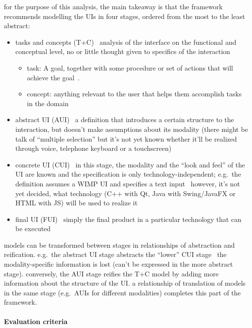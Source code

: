 for the purpose of this analysis, the main takeaway is that the framework recommends modelling the UIs in four stages, ordered from the most to the least abstract:
\begin{itemize}
    \item tasks and concepts (T+C) \textemdash\ analysis of the interface on the functional and conceptual level, no or little thought given to specifics of the interaction
    \begin{itemize}
        \item task: A goal, together with some procedure or set of actions that will achieve the goal~\cite{calvary_cameleon_glossary_2002}.
        \item concept: anything relevant to the user that helps them accomplish tasks in the domain
    \end{itemize}
    \item abstract UI (AUI) \textemdash\ a definition that introduces a certain structure to the interaction, but doesn't make assumptions about its modality (there might be talk of \enquote{multiple selection} but it's not yet known whether it'll be realized through voice, telephone keyboard or a touchscreen)
    \item concrete UI (CUI) \textemdash\ in this stage, the modality and the \enquote{look and feel} of the UI are known and the specification is only technology-independent;
    e.g.\ the definition assumes a WIMP UI and specifies a text input \textemdash\ however, it's not yet decided, what technology (C++ with Qt, Java with Swing/JavaFX or HTML with JS) will be used to realize it
    \item final UI (FUI) \textemdash\ simply the final product in a particular technology that can be executed
\end{itemize}

models can be transformed between stages in relationships of abstraction and reification.
e.g.\ the abstract UI stage abstracts the \enquote{lower} CUI stage \textemdash\ the modality-specific information is lost (can't be expressed in the more abstract stage).
conversely, the AUI stage reifies the T+C model by adding more information about the structure of the UI\@.
a relationship of translation of models in the same stage (e.g.\ AUIs for different modalities) completes this part of the framework.

\paragraph{Evaluation criteria}

